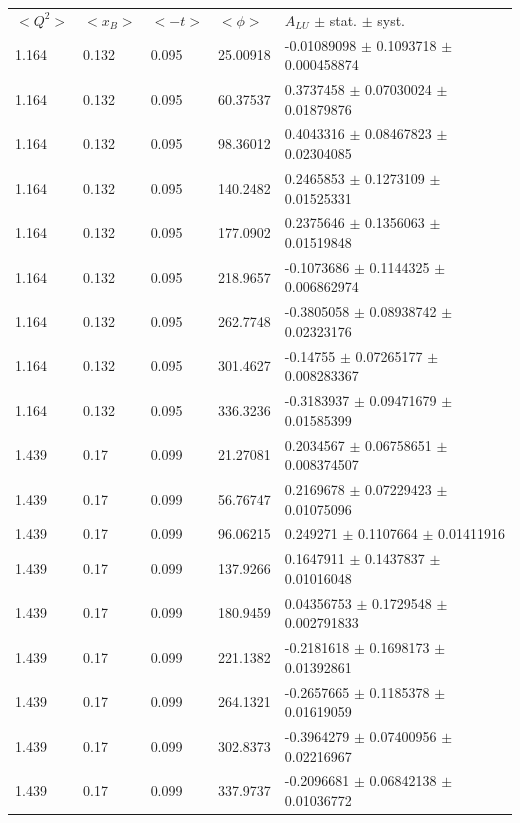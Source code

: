 \begin{table}[!h]
   \begin{center}
      \begin{tabular}{||l|l|l|l|l||}
         \hline
 $<Q^{2}>$ & $<x_{B}>$ & $<-t>$ & $<\phi>$ & $A_{LU}$ $\pm$ stat. $\pm$ syst.\\
        1.164 & 0.132 & 0.095 & 25.00918 & -0.01089098 $\pm$ 0.1093718   $\pm$   
         0.000458874        \\
        1.164 & 0.132 & 0.095 & 60.37537 & 0.3737458   $\pm$ 0.07030024  $\pm$   0.01879876       \\
        1.164 & 0.132 & 0.095 & 98.36012 & 0.4043316   $\pm$ 0.08467823  $\pm$   0.02304085       \\
        1.164 & 0.132 & 0.095 & 140.2482 & 0.2465853   $\pm$ 0.1273109   $\pm$   0.01525331       \\
        1.164 & 0.132 & 0.095 & 177.0902 & 0.2375646   $\pm$ 0.1356063   $\pm$   0.01519848       \\
        1.164 & 0.132 & 0.095 & 218.9657 & -0.1073686  $\pm$ 0.1144325   $\pm$   0.006862974      \\
        1.164 & 0.132 & 0.095 & 262.7748 & -0.3805058  $\pm$ 0.08938742  $\pm$   0.02323176       \\
        1.164 & 0.132 & 0.095 & 301.4627 & -0.14755    $\pm$ 0.07265177  $\pm$   0.008283367      \\
        1.164 & 0.132 & 0.095 & 336.3236 & -0.3183937  $\pm$ 0.09471679  $\pm$   0.01585399       \\
                                                                                                 
         \hline
        1.439 & 0.17 & 0.099 &  21.27081  & 0.2034567  $\pm$  0.06758651  $\pm$  
0.008374507     \\
        1.439 & 0.17 & 0.099 &  56.76747  & 0.2169678  $\pm$  0.07229423  $\pm$  0.01075096      \\
        1.439 & 0.17 & 0.099 &  96.06215  & 0.249271   $\pm$  0.1107664   $\pm$  0.01411916      \\
        1.439 & 0.17 & 0.099 &  137.9266  & 0.1647911  $\pm$  0.1437837   $\pm$  0.01016048      \\
        1.439 & 0.17 & 0.099 &  180.9459  & 0.04356753 $\pm$  0.1729548   $\pm$  0.002791833     \\
        1.439 & 0.17 & 0.099 &  221.1382  & -0.2181618 $\pm$  0.1698173   $\pm$  0.01392861      \\
        1.439 & 0.17 & 0.099 &  264.1321  & -0.2657665 $\pm$  0.1185378   $\pm$  0.01619059      \\
        1.439 & 0.17 & 0.099 &  302.8373  & -0.3964279 $\pm$  0.07400956  $\pm$  0.02216967      \\
        1.439 & 0.17 & 0.099 &  337.9737  & -0.2096681 $\pm$  0.06842138  $\pm$  0.01036772      \\
                                                                                                 

\end{tabular}
\end{center}
\end{table}
